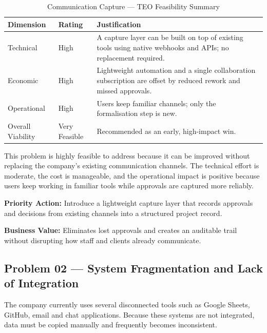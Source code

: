 \documentclass[12pt,a4paper]{report}
\begin{document}
\begin{table}[H]
\centering
\renewcommand{\arraystretch}{1.3}
\begin{tabularx}{\textwidth}{|p{3cm}|p{2.5cm}|X|}
\hline
\rowcolor{secondary}
\textbf{Dimension} & \textbf{Rating} & \textbf{Justification} \\
\hline
Technical & High & A capture layer can be built on top of existing tools using native webhooks and APIs; no replacement required. \\
\hline
Economic & High & Lightweight automation and a single collaboration subscription are offset by reduced rework and missed approvals. \\
\hline
Operational & High & Users keep familiar channels; only the formalisation step is new. \\
\hline
Overall Viability & Very Feasible & Recommended as an early, high-impact win. \\
\hline
\end{tabularx}
\caption{Communication Capture --- TEO Feasibility Summary}
\end{table}

\begin{summaryBox}
This problem is highly feasible to address because it can be improved without replacing the company's existing communication channels. The technical effort is moderate, the cost is manageable, and the operational impact is positive because users keep working in familiar tools while approvals are captured more reliably.
\end{summaryBox}

\begin{recommendBox}
\textbf{Priority Action:} Introduce a lightweight capture layer that records approvals and decisions from existing channels into a structured project record.

\textbf{Business Value:} Eliminates lost approvals and creates an auditable trail without disrupting how staff and clients already communicate.
\end{recommendBox}

\subsection{Problem 02 --- System Fragmentation and Lack of Integration}

\begin{problemBox}
The company currently uses several disconnected tools such as Google Sheets, GitHub, email and chat applications. Because these systems are not integrated, data must be copied manually and frequently becomes inconsistent.
\end{problemBox}
\end{document}

